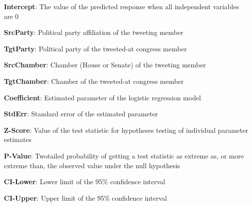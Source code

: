 \documentclass[11pt]{article}
\begin{document}
\begin{table}[h]
\caption{Logistic regression model for the likelihood of Twitter interaction between Congress members based on their partisanship and chamber association.}
\label{table:logit_model_fixtures}
\begin{threeparttable}
\renewcommand{\TPTminimum}{\linewidth}
\begin{tablenotes}
\footnotesize
\item \textbf{Intercept}: The value of the predicted response when all independent variables are 0
\item \textbf{SrcParty}: Political party affiliation of the tweeting member
\item \textbf{TgtParty}: Political party of the tweeted-at congress member
\item \textbf{SrcChamber}: Chamber (House or Senate) of the tweeting member
\item \textbf{TgtChamber}: Chamber of the tweeted-at congress member
\item \textbf{Coefficient}: Estimated parameter of the logistic regression model
\item \textbf{StdErr}: Standard error of the estimated parameter
\item \textbf{Z-Score}: Value of the test statistic for hypotheses testing of individual parameter estimates
\item \textbf{P-Value}: Twotailed probability of getting a test statistic as extreme as, or more extreme than, the observed value under the null hypothesis
\item \textbf{CI-Lower}: Lower limit of the 95\% confidence interval
\item \textbf{CI-Upper}: Upper limit of the 95\% confidence interval
\end{tablenotes}
\end{threeparttable}
\end{table}
\end{document}
